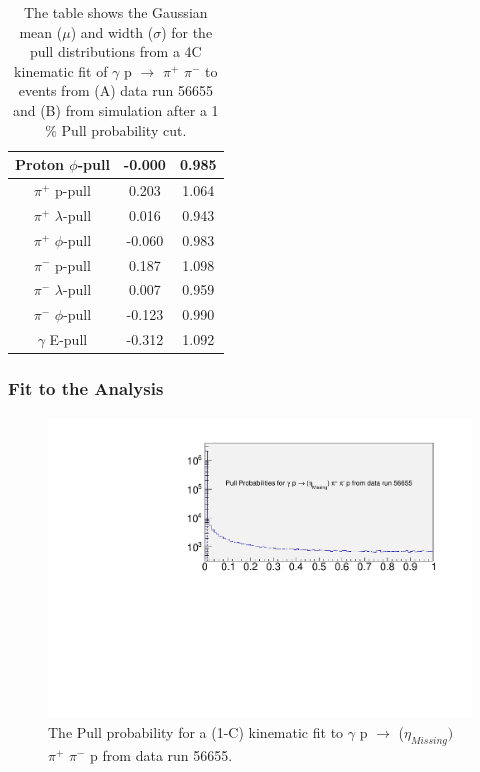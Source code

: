 \documentclass[12pt,a4paper]{amsbook}
\theoremstyle{definition}
\begin{document}
\begin{table}
\begin{subtable}{.5\textwidth}
\begin{tabular}{ |c|c|c| }
\hline
Proton $\phi$-pull                         & -0.000 & 0.985  \\
\hline
$\pi^{+}$ p-pull        & 0.203  & 1.064  \\
\hline
$\pi^{+}$ $\lambda$-pull & 0.016  & 0.943  \\
\hline
$\pi^{+}$ $\phi$-pull    & -0.060 & 0.983  \\
\hline
$\pi^{-}$ p-pull        & 0.187  & 1.098  \\
\hline
$\pi^{-}$ $\lambda$-pull & 0.007  & 0.959  \\
\hline
$\pi^{-}$ $\phi$-pull    & -0.123 & 0.990  \\
\hline
$\gamma$ E-pull                           & -0.312 & 1.092  \\ 
\hline
\end{tabular}
\end{subtable}%
\caption{The table shows the Gaussian mean ($\mu$) and width ($\sigma$) for the pull distributions from a 4C kinematic fit of  $\gamma$ p $\rightarrow$ $\pi^{+}$ $\pi^{-}$ to events from (A) data run 56655 and (B) from simulation after a 1$\%$ Pull probability cut.} 
\label{tab2}
\end{table}

\subsubsection{Fit to the Analysis}
	
\begin{figure}[ht!]
\centerline{
\includegraphics[width=12cm,height=8cm]{Prob_etafit.pdf}}
\caption{The Pull probability for a (1-C) kinematic fit to $\gamma$ p $\rightarrow$ ($\eta_{Missing})$ $\pi^{+}$ $\pi^{-}$ p from data run 56655.}
\label{Fig5}
\end{figure} 
\end{document}
